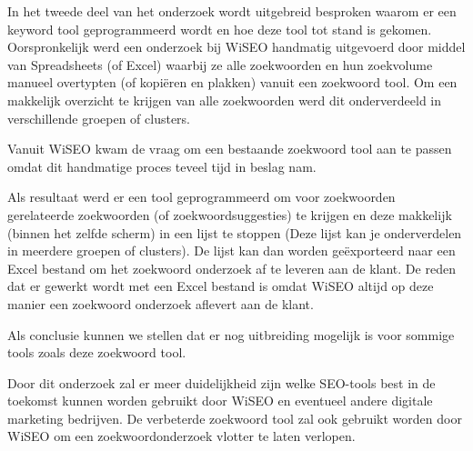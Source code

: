 In het tweede deel van het onderzoek wordt uitgebreid besproken waarom er een keyword tool geprogrammeerd wordt en hoe deze tool tot stand is gekomen. Oorspronkelijk werd een onderzoek bij WiSEO handmatig uitgevoerd door middel van Spreadsheets (of Excel) waarbij ze alle zoekwoorden en hun zoekvolume manueel overtypten (of kopiëren en plakken) vanuit een zoekwoord tool. Om een makkelijk overzicht te krijgen van alle zoekwoorden werd dit onderverdeeld in verschillende groepen of clusters. 

Vanuit WiSEO kwam de vraag om een bestaande zoekwoord tool aan te passen omdat dit handmatige proces teveel tijd in beslag nam. 

 Als resultaat werd er een tool geprogrammeerd om voor zoekwoorden gerelateerde zoekwoorden (of zoekwoordsuggesties) te krijgen en deze makkelijk (binnen het zelfde scherm) in een lijst te stoppen (Deze lijst kan je onderverdelen in meerdere groepen of clusters). De lijst kan dan worden geëxporteerd naar een Excel bestand om het zoekwoord onderzoek af te leveren aan de klant. De reden dat er gewerkt wordt met een Excel bestand is omdat WiSEO altijd op deze manier een zoekwoord onderzoek aflevert aan de klant. 

Als conclusie kunnen we stellen dat er nog uitbreiding mogelijk is voor sommige tools zoals deze zoekwoord tool.

Door dit onderzoek zal er meer duidelijkheid zijn welke SEO-tools best in de toekomst kunnen worden gebruikt door WiSEO en eventueel andere digitale marketing bedrijven. De verbeterde zoekwoord tool zal ook gebruikt worden door WiSEO om een zoekwoordonderzoek vlotter te laten verlopen. 
